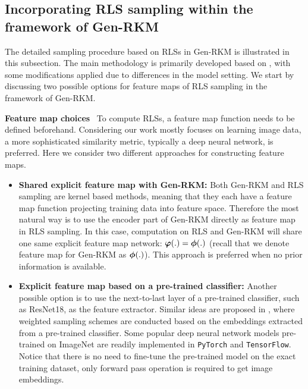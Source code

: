 \subsection{Incorporating RLS sampling within the framework of Gen-RKM}
\label{subsec-methods-incor-rls-with-Genrkm}
The detailed sampling procedure based on RLSs in Gen-RKM is illustrated in this subsection. The main methodology is primarily developed based on \cite{schreursLeverageScoreSampling2022}, with some modifications applied due to differences in the model setting. We start by discussing two possible options for feature maps of RLS sampling in the framework of Gen-RKM.

\noindent\textbf{Feature map choices }\ To compute RLSs, a feature map function needs to be defined beforehand. Considering our work mostly focuses on learning image data, a more sophisticated similarity metric, typically a deep neural network, is preferred. Here we consider two different approaches for constructing feature maps.
\begin{itemize}
    \item \textbf{Shared explicit feature map with Gen-RKM: } Both Gen-RKM and RLS sampling are kernel based methods, meaning that they each have a feature map function projecting training data into feature space. Therefore the most natural way is to use the encoder part of Gen-RKM directly as feature map in RLS sampling. In this case, computation on RLS and Gen-RKM will share one same explicit feature map network: $\boldsymbol{\varphi}(.)=\boldsymbol{\phi}(.)$ (recall that we denote feature map for Gen-RKM as $\boldsymbol{\phi}(.)$). This approach is preferred when no prior information is available.
    \item  \textbf{Explicit feature map based on a pre-trained classifier: } Another possible option is to use the next-to-last layer of a pre-trained classifier, such as ResNet18\cite{heDeepResidualLearning2016}, as the feature extractor. Similar ideas are proposed in \cite{schreursLeverageScoreSampling2022, zhangDeterminantalPointProcesses2017a}, where weighted sampling schemes are conducted based on the embeddings extracted from a pre-trained classifier. Some popular deep neural network models pre-trained on ImageNet\cite{dengImageNetLargescaleHierarchical2009} are readily implemented in \texttt{PyTorch} and \texttt{TensorFlow}. Notice that there is no need to fine-tune the pre-trained model on the exact training dataset, only forward pass operation is required to get image embeddings.
\end{itemize}

